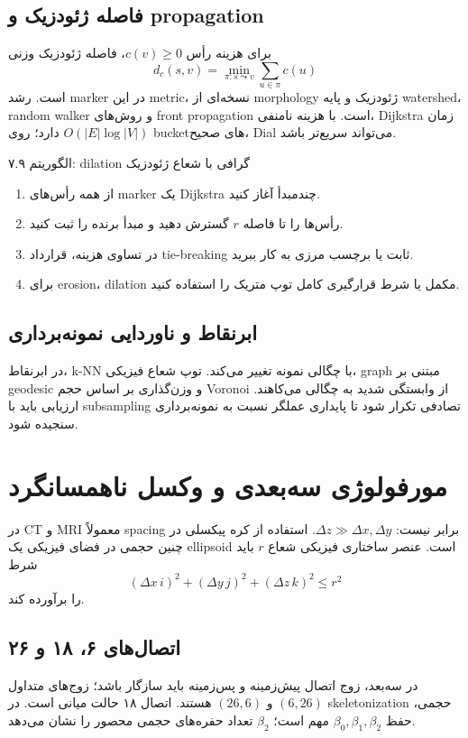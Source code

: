 \documentclass[12pt,openany,oneside]{book}
\begin{document}
\subsection{فاصله ژئودزیک و propagation}
برای هزینه رأس \(c(v)\ge0\)، فاصله ژئودزیک وزنی
\begin{equation}
d_c(s,v)=\min_{\pi:s\leadsto v}\sum_{u\in\pi}c(u)
\end{equation}
است. رشد marker در این metric، نسخه‌ای از morphology ژئودزیک و پایه watershed، random walker و روش‌های
front propagation است. با هزینه نامنفی، Dijkstra زمان \(O(|E|\log|V|)\) دارد؛ روی bucketهای صحیح، Dial
می‌تواند سریع‌تر باشد.

\begin{algorithmbox}{الگوریتم ۷.۹: dilation گرافی با شعاع ژئودزیک}
\begin{enumerate}
\item از همه رأس‌های marker یک Dijkstra چندمبدأ آغاز کنید.
\item رأس‌ها را تا فاصله \(r\) گسترش دهید و مبدأ برنده را ثبت کنید.
\item در تساوی هزینه، قرارداد tie-breaking ثابت یا برچسب مرزی به کار ببرید.
\item برای erosion، dilation مکمل یا شرط قرارگیری کامل توپ متریک را استفاده کنید.
\end{enumerate}
\end{algorithmbox}

\subsection{ابرنقاط و ناوردایی نمونه‌برداری}
در ابرنقاط، k-NN با چگالی نمونه تغییر می‌کند. توپ شعاع فیزیکی، graph مبتنی بر geodesic و وزن‌گذاری بر اساس
حجم Voronoi از وابستگی شدید به چگالی می‌کاهند. ارزیابی باید با subsampling تصادفی تکرار شود تا پایداری
عملگر نسبت به نمونه‌برداری سنجیده شود.

\section{مورفولوژی سه‌بعدی و وکسل ناهمسانگرد}
در CT و MRI معمولاً spacing برابر نیست: \(\Delta z\gg\Delta x,\Delta y\). استفاده از کره پیکسلی در چنین حجمی
در فضای فیزیکی یک ellipsoid است. عنصر ساختاری فیزیکی شعاع \(r\) باید شرط
\begin{equation}
(\Delta x\,i)^2+(\Delta y\,j)^2+(\Delta z\,k)^2\le r^2
\end{equation}
را برآورده کند.

\subsection{اتصال‌های ۶، ۱۸ و ۲۶}
در سه‌بعد، زوج اتصال پیش‌زمینه و پس‌زمینه باید سازگار باشد؛ زوج‌های متداول \((6,26)\) و \((26,6)\) هستند.
اتصال ۱۸ حالت میانی است. در skeletonization حجمی، حفظ \(\beta_0,\beta_1,\beta_2\) مهم است؛ \(\beta_2\) تعداد
حفره‌های حجمی محصور را نشان می‌دهد.
\end{document}
